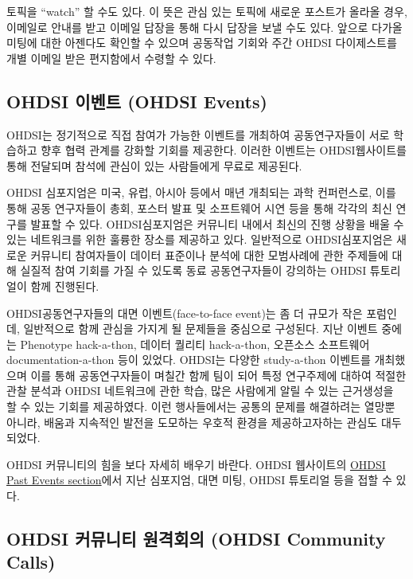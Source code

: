 \documentclass[11pt]{book}
\theoremstyle{definition}
\theoremstyle{definition}
\theoremstyle{definition}
\theoremstyle{remark}
\let\BeginKnitrBlock\begin \let\EndKnitrBlock\end
\begin{document}
\BeginKnitrBlock{rmdimportant}
토픽을 ``watch'' 할 수도 있다. 이 뜻은 관심 있는 토픽에 새로운 포스트가
올라올 경우, 이메일로 안내를 받고 이메일 답장을 통해 다시 답장을 보낼
수도 있다. 앞으로 다가올 미팅에 대한 아젠다도 확인할 수 있으며 공동작업
기회와 주간 OHDSI 다이제스트를 개별 이메일 받은 편지함에서 수령할 수
있다.
\EndKnitrBlock{rmdimportant}

\subsection{OHDSI 이벤트 (OHDSI Events)}\label{ohdsi--ohdsi-events}

OHDSI는 정기적으로 직접 참여가 가능한 이벤트를 개최하여 공동연구자들이
서로 학습하고 향후 협력 관계를 강화할 기회를 제공한다. 이러한 이벤트는
OHDSI웹사이트를 통해 전달되며 참석에 관심이 있는 사람들에게 무료로
제공된다.

OHDSI 심포지엄은 미국, 유럽, 아시아 등에서 매년 개최되는 과학
컨퍼런스로, 이를 통해 공동 연구자들이 총회, 포스터 발표 및 소프트웨어
시연 등을 통해 각각의 최신 연구를 발표할 수 있다. OHDSI심포지엄은
커뮤니티 내에서 최신의 진행 상황을 배울 수 있는 네트워크를 위한 훌륭한
장소를 제공하고 있다. 일반적으로 OHDSI심포지엄은 새로운 커뮤니티
참여자들이 데이터 표준이나 분석에 대한 모범사례에 관한 주제들에 대해
실질적 참여 기회를 가질 수 있도록 동료 공동연구자들이 강의하는 OHDSI
튜토리얼이 함께 진행된다.

OHDSI공동연구자들의 대면 이벤트(face-to-face event)는 좀 더 규모가 작은
포럼인데, 일반적으로 함께 관심을 가지게 될 문제들을 중심으로 구성된다.
지난 이벤트 중에는 Phenotype hack-a-thon, 데이터 퀄리티 hack-a-thon,
오픈소스 소프트웨어 documentation-a-thon 등이 있었다. OHDSI는 다양한
study-a-thon 이벤트를 개최했으며 이를 통해 공동연구자들이 며칠간 함께
팀이 되어 특정 연구주제에 대하여 적절한 관찰 분석과 OHDSI 네트워크에
관한 학습, 많은 사람에게 알릴 수 있는 근거생성을 할 수 있는 기회를
제공하였다. 이런 행사들에서는 공통의 문제를 해결하려는 열망뿐 아니라,
배움과 지속적인 발전을 도모하는 우호적 환경을 제공하고자하는 관심도
대두되었다.

OHDSI 커뮤니티의 힘을 보다 자세히 배우기 바란다. OHDSI 웹사이트의
\href{https://www.ohdsi.org/past-events/}{OHDSI Past Events section}에서
지난 심포지엄, 대면 미팅, OHDSI 튜토리얼 등을 접할 수 있다.

\subsection{OHDSI 커뮤니티 원격회의 (OHDSI Community
Calls)}\label{ohdsi---ohdsi-community-calls}
\end{document}
